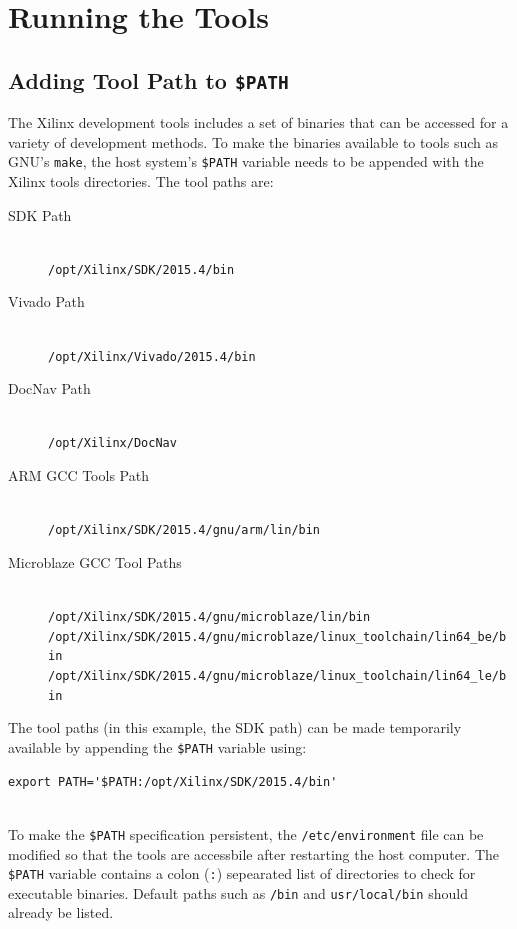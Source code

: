 \section{Running the Tools}

\subsection{Adding Tool Path to \texttt{\$PATH}}

The Xilinx development tools includes a set of binaries that can be accessed for a variety of development methods. To make the binaries available to tools such as GNU's \texttt{make}, the host system's \texttt{\$PATH} variable needs to be appended with the Xilinx tools directories. The tool paths are:

\begin{description}
	\item[SDK Path] \hfill \\
		\texttt{/opt/Xilinx/SDK/2015.4/bin}
	\item[Vivado Path] \hfill \\
		\texttt{/opt/Xilinx/Vivado/2015.4/bin}
	\item[DocNav Path] \hfill \\
		\texttt{/opt/Xilinx/DocNav}
	\item[ARM GCC Tools Path] \hfill \\
		\texttt{/opt/Xilinx/SDK/2015.4/gnu/arm/lin/bin}
	\item[Microblaze GCC Tool Paths] \hfill \\
	    \texttt{/opt/Xilinx/SDK/2015.4/gnu/microblaze/lin/bin} \\
		\texttt{/opt/Xilinx/SDK/2015.4/gnu/microblaze/linux\_toolchain/lin64\_be/bin} \\
		\texttt{/opt/Xilinx/SDK/2015.4/gnu/microblaze/linux\_toolchain/lin64\_le/bin}
\end{description}

\noindent
The tool paths (in this example, the SDK path) can be made temporarily available by appending the \texttt{\$PATH} variable using: \\

\begin{lstlisting}
export PATH='$PATH:/opt/Xilinx/SDK/2015.4/bin'
\end{lstlisting}

~\\
\noindent
To make the \texttt{\$PATH} specification persistent, the \texttt{/etc/environment} file can be modified so that the tools are accessbile after restarting the host computer. The \texttt{\$PATH} variable contains a colon (\texttt{:}) sepearated list of directories to check for executable binaries. Default paths such as \texttt{/bin} and \texttt{usr/local/bin} should already be listed. \\


